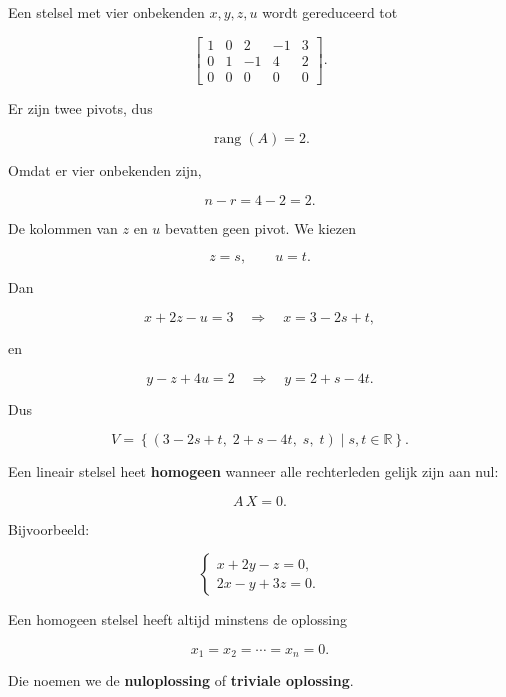 \documentclass{ximera}
\begin{document}
\begin{voorbeeld}

Een stelsel met vier onbekenden \(x,y,z,u\) wordt gereduceerd tot

\[
\left[
\begin{array}{cccc|c}
1&0&2&-1&3\\
0&1&-1&4&2\\
0&0&0&0&0
\end{array}
\right].
\]

Er zijn twee pivots, dus

\[
\operatorname{rang}(A)=2.
\]

Omdat er vier onbekenden zijn,

\[
n-r=4-2=2.
\]

De kolommen van \(z\) en \(u\) bevatten geen pivot.
We kiezen

\[
z=s,
\qquad
u=t.
\]

Dan

\[
x+2z-u=3
\quad\Longrightarrow\quad
x=3-2s+t,
\]

en

\[
y-z+4u=2
\quad\Longrightarrow\quad
y=2+s-4t.
\]

Dus

\[
V=
\left\{
(3-2s+t,\;2+s-4t,\;s,\;t)
\mid s,t\in\mathbb{R}
\right\}.
\]

\end{voorbeeld}





\begin{definitie}
Een lineair stelsel heet \textbf{homogeen} wanneer alle rechterleden
gelijk zijn aan nul:

\[
A\,X=0.
\]
\end{definitie}


Bijvoorbeeld:

\[
\begin{cases}
x+2y-z=0,\\
2x-y+3z=0.
\end{cases}
\]


Een homogeen stelsel heeft altijd minstens de oplossing

\[
x_1=x_2=\cdots=x_n=0.
\]

Die noemen we de \textbf{nuloplossing} of \textbf{triviale oplossing}.
\end{document}
